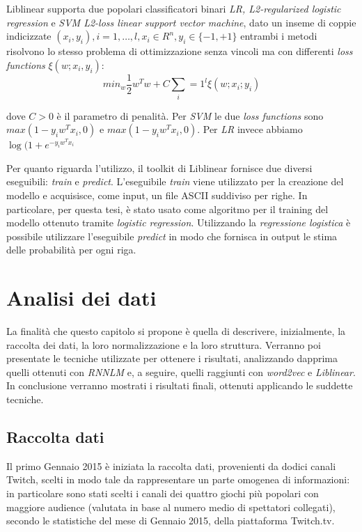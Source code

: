 \documentclass[a4paper,12pt,openright,twoside]{report}
\theoremstyle{definition}
\begin{document}
Liblinear supporta due popolari classificatori binari \emph{LR, L2-regularized logistic regression} e 
\emph{SVM L2-loss linear support vector machine}, dato un inseme di coppie
indicizzate $(x_i,y_i),i=1,\dots{},l,x_i\in R^n, y_i \in \{-1,+1\}$ entrambi i metodi risolvono lo stesso
problema di ottimizzazione senza vincoli ma con differenti \emph{loss functions} $\xi(w;x_i,y_i)$:
\begin{equation}
	min_w \frac{1}{2}w^Tw+C\sum_i=1^l\xi(w;x_i;y_i)
	\label{eqn:liblinear1}
\end{equation}

dove $C > 0$ è il parametro di penalità. Per \emph{SVM} le due \emph{loss functions} sono $max(1-y_iw^Tx_i,0)$ e
$max(1-y_iw^Tx_i,0)$. Per \emph{LR} invece abbiamo $\log(1+e^{-y_iw^Tx_i}$

Per quanto riguarda l'utilizzo, il toolkit di Liblinear fornisce due diversi eseguibili: \emph{train} e 
\emph{predict}.
L'eseguibile \emph{train} viene utilizzato per la creazione del modello e acquisisce, come input, un file
ASCII suddiviso per righe. In particolare, per questa tesi, è stato usato come algoritmo 
per il training del modello ottenuto tramite \emph{logistic regression}.
Utilizzando la \emph{regressione logistica} è possibile utilizzare l'eseguibile \emph{predict} in modo 
che fornisca in output le stima delle probabilità per ogni riga.

\chapter{Analisi dei dati}
La finalità che questo capitolo si propone è quella di descrivere, inizialmente, la raccolta dei dati, 
la loro normalizzazione e la loro struttura. 
Verranno poi presentate le tecniche utilizzate per ottenere i risultati, 
analizzando dapprima quelli ottenuti con  \emph{RNNLM}
 e, a seguire, quelli raggiunti con \emph{word2vec} e \emph{Liblinear}.
 In conclusione verranno mostrati i risultati finali, ottenuti applicando le suddette tecniche.

\section{Raccolta dati}
Il primo Gennaio 2015 è iniziata la raccolta dati, provenienti da dodici canali 
Twitch, scelti in modo tale da rappresentare un parte omogenea di informazioni: in particolare sono stati scelti 
i canali dei quattro giochi più popolari con maggiore audience 
(valutata in base al numero medio di spettatori collegati), 
secondo le statistiche del mese di Gennaio 2015, della piattaforma Twitch.tv.
\end{document}
